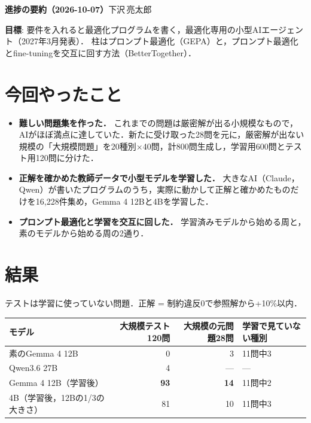 \documentclass[10pt,a4paper]{article}
\begin{document}
{\LARGE\bfseries 進捗の要約（2026-10-07）}\hfill 下沢\,亮太郎

\medskip
\textbf{目標}: 要件を入れると最適化プログラムを書く，最適化専用の小型AIエージェント（2027年3月発表）．
柱はプロンプト最適化（GEPA）と，プロンプト最適化とfine-tuningを交互に回す方法（BetterTogether）．

\section{今回やったこと}
\begin{itemize}
  \item \textbf{難しい問題集を作った．} これまでの問題は厳密解が出る小規模なもので，AIがほぼ満点に達していた．新たに受け取った28問を元に，厳密解が出ない規模の「大規模問題」を20種別$\times$40問，計800問生成し，学習用600問とテスト用120問に分けた．
  \item \textbf{正解を確かめた教師データで小型モデルを学習した．} 大きなAI（Claude，Qwen）が書いたプログラムのうち，実際に動かして正解と確かめたものだけを16,228件集め，Gemma 4 12Bと4Bを学習した．
  \item \textbf{プロンプト最適化と学習を交互に回した．} 学習済みモデルから始める周と，素のモデルから始める周の2通り．
\end{itemize}

\section{結果}
テストは学習に使っていない問題．正解 = 制約違反0で参照解から+10\%以内．

\begin{table}[h]
  \centering
  \small
  \begin{tabular}{lrrl}
    \toprule
    モデル & 大規模テスト120問 & 大規模の元問題28問 & 学習で見ていない種別 \\
    \midrule
    素のGemma 4 12B & 0 & 3 & 11問中3 \\
    Qwen3.6 27B & 4 & --- & --- \\
    Gemma 4 12B（学習後） & \textbf{93} & \textbf{14} & 11問中2 \\
    4B（学習後，12Bの1/3の大きさ） & 81 & 10 & 11問中3 \\
    \bottomrule
  \end{tabular}
\end{table}
\end{document}
